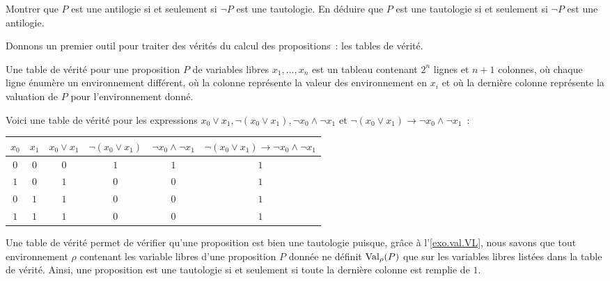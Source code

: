 \begin{exercise}
  Montrer que $P$ est une antilogie si et seulement si $\lnot P$ est une
  tautologie. En déduire que $P$ est une tautologie si et seulement si $\lnot P$
  est une antilogie.
\end{exercise}

Donnons un premier outil pour traiter des vérités du calcul des propositions~:
les tables de vérité.

\begin{definition}
  Une table de vérité pour une proposition $P$ de variables libres
  $x_1,\ldots,x_n$ est un tableau contenant $2^n$ lignes et $n+1$ colonnes, où
  chaque ligne énumère un environnement différent, où la
   colonne représente la valeur des environnement en
  $x_i$ et où la dernière colonne représente la valuation de $P$ pour
  l'environnement donné.
\end{definition}

\begin{example}
  Voici une table de vérité pour les expressions
  $x_0\lor x_1, \lnot (x_0\lor x_1), \lnot x_0\land \lnot x_1$ et
  $\lnot (x_0 \lor x_1)\to \lnot x_0 \land \lnot x_1$~:
  \begin{center}
    \begin{tabular}{|c|c|c|c|c|c|}
      \hline $x_0$ & $x_1$ & $x_0\lor x_1$ & $\lnot (x_0\lor x_1)$ &
      $\lnot x_0 \land \lnot x_1$ &
      $\lnot (x_0 \lor x_1)\to \lnot x_0 \land \lnot x_1$\\
      \hline $0$ & $0$ & $0$ & $1$ & $1$ & $1$ \\
      \hline $1$ & $0$ & $1$ & $0$ & $0$ & $1$ \\
      \hline $0$ & $1$ & $1$ & $0$ & $0$ & $1$ \\
      \hline $1$ & $1$ & $1$ & $0$ & $0$ & $1$ \\
      \hline
    \end{tabular}
  \end{center}
\end{example}

Une table de vérité permet de vérifier qu'une proposition est bien une
tautologie puisque, grâce à l'\cref{exo.val.VL}, nous savons que tout
environnement $\rho$ contenant les variable libres d'une proposition $P$ donnée
ne définit $\operatorname{Val}_\rho(P)$ que sur les variables libres listées dans la table de
vérité. Ainsi, une proposition est une tautologie si et seulement si toute la
dernière colonne est remplie de $1$.

